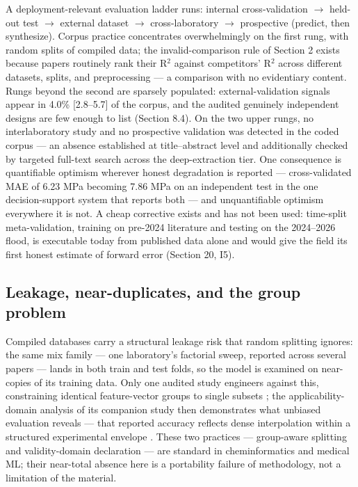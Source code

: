 \documentclass[pdflatex,sn-basic]{sn-jnl}
\begin{document}
A deployment-relevant evaluation ladder runs: internal cross-validation $\rightarrow$ held-out test $\rightarrow$ external dataset $\rightarrow$ cross-laboratory $\rightarrow$ prospective (predict, then synthesize). Corpus practice concentrates overwhelmingly on the first rung, with random splits of compiled data; the invalid-comparison rule of Section 2 exists because papers routinely rank their R$^2$ against competitors' R$^2$ across different datasets, splits, and preprocessing --- a comparison with no evidentiary content. Rungs beyond the second are sparsely populated: external-validation signals appear in 4.0\% [2.8--5.7] of the corpus, and the audited genuinely independent designs are few enough to list (Section 8.4). On the two upper rungs, no interlaboratory study and no prospective validation was detected in the coded corpus --- an absence established at title--abstract level and additionally checked by targeted full-text search across the deep-extraction tier. One consequence is quantifiable optimism wherever honest degradation is reported --- cross-validated MAE of 6.23 MPa becoming 7.86 MPa on an independent test in the one decision-support system that reports both \citep{natarajan2026} --- and unquantifiable optimism everywhere it is not. A cheap corrective exists and has not been used: time-split meta-validation, training on pre-2024 literature and testing on the 2024--2026 flood, is executable today from published data alone and would give the field its first honest estimate of forward error (Section 20, I5).

\subsection{Leakage, near-duplicates, and the group problem}

Compiled databases carry a structural leakage risk that random splitting ignores: the same mix family --- one laboratory's factorial sweep, reported across several papers --- lands in both train and test folds, so the model is examined on near-copies of its training data. Only one audited study engineers against this, constraining identical feature-vector groups to single subsets \citep{parakhiya2026}; the applicability-domain analysis of its companion study then demonstrates what unbiased evaluation reveals --- that reported accuracy reflects dense interpolation within a structured experimental envelope \citep{jagad2026}. These two practices --- group-aware splitting and validity-domain declaration --- are standard in cheminformatics and medical ML; their near-total absence here is a portability failure of methodology, not a limitation of the material.
\end{document}
